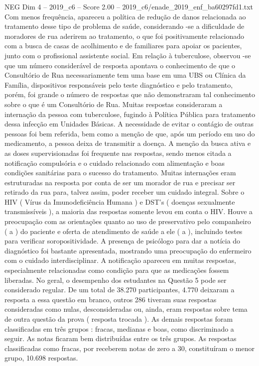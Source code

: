 \begin{textsample}{NEG Dim 4 – 2019\_c6 – Score 2.00 – 2019\_c6/enade\_2019\_enf\_ba60297fd1.txt}
Com menos frequência, apareceu a política de redução de danos relacionada ao tratamento desse tipo de problema de saúde, considerando -se a dificuldade de moradores de rua aderirem ao tratamento, o que foi positivamente relacionado com a busca de casas de acolhimento e de familiares para apoiar os pacientes, junto com o profissional assistente social.
Em relação à tuberculose, observou -se que um número considerável de resposta apontava o conhecimento de que o Consultório de Rua necessariamente tem uma base em uma UBS ou Clínica da Família, dispositivos responsáveis pelo teste diagnóstico e pelo tratamento, porém, foi grande o número de respostas que não demonstraram tal conhecimento sobre o que é um Consultório de Rua.
Muitas respostas consideraram a internação da pessoa com tuberculose, fugindo à Política Pública para tratamento dessa infecção em Unidades Básicas.
A necessidade de evitar o contágio de outras pessoas foi bem referida, bem como a menção de que, após um período em uso do medicamento, a pessoa deixa de transmitir a doença.
A menção da busca ativa e as doses supervisionadas foi frequente nas respostas, sendo menos citada a notificação compulsória e o cuidado relacionado com alimentação e boas condições sanitárias para o sucesso do tratamento.
Muitas internações eram estruturadas na resposta por conta de ser um morador de rua e precisar ser retirado da rua para, talvez assim, poder receber um cuidado integral.
Sobre o HIV ( Vírus da Imunodeficiência Humana ) e DST’s ( doenças sexualmente transmissíveis ), a maioria das respostas somente levou em conta o HIV.
Houve a preocupação com as orientações quanto ao uso de preservativo pelo companheiro ( a ) do paciente e oferta de atendimento de saúde a ele ( a ), incluindo testes para verificar soropositividade.
A presença de psicólogo para dar a notícia do diagnóstico foi bastante apresentada, mostrando uma preocupação do enfermeiro com o cuidado interdisciplinar.
A notificação apareceu em muitas respostas, especialmente relacionadas como condição para que as medicações fossem liberadas.
No geral, o desempenho dos estudantes na Questão 5 pode ser considerado regular.
De um total de 38.270 participantes, 4.770 deixaram a resposta a essa questão em branco, outros 286 tiveram suas respostas consideradas como nulas, desconsideradas ou, ainda, eram respostas sobre tema de outra questão da prova ( resposta trocada ).
As demais respostas foram classificadas em três grupos : fracas, medianas e boas, como discriminado a seguir.
As notas ficaram bem distribuídas entre os três grupos.
As respostas classificadas como fracas, por receberem notas de zero a 30, constituíram o menor grupo, 10.698 respostas.

\end{textsample}
